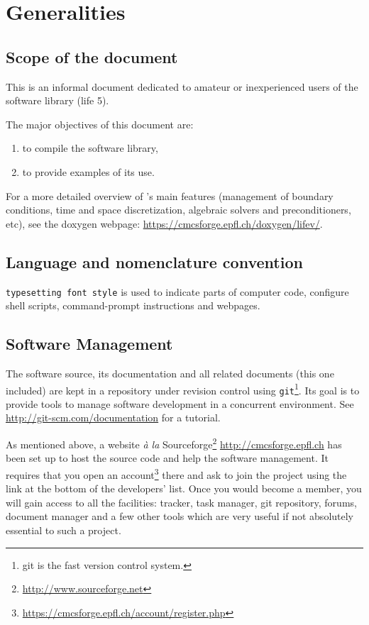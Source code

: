 
\chapter{Generalities}
\label{cha:generalities}

\section{Scope of the document}
\label{sec:scope-document}

This is an informal document dedicated to amateur or inexperienced users of the
software library \thelibrary (life 5).

The major objectives of this document are:
\begin{enumerate}
\item to compile the software library,
\item to provide examples of its use.
\end{enumerate}
For a more detailed overview of \lifev's main features (management of boundary conditions, time and space discretization, algebraic solvers and preconditioners, etc), see the doxygen webpage: \url{https://cmcsforge.epfl.ch/doxygen/lifev/}.
\section{Language and nomenclature convention}
\label{sec:lang-nomencl-conv}

\texttt{typesetting font style} is used to indicate parts of
computer code, configure shell scripts, command-prompt instructions and webpages.

\section{Software Management}
\label{sec:software-management}

The software source, its documentation and all related documents (this
one included) are kept in a repository under revision control
using \verb!git!\footnote{git is the fast version control system.}. Its goal
is to provide tools to manage software development in a concurrent environment.
See \url{http://git-scm.com/documentation}
for a tutorial.

As mentioned above, a website {\it\`a la} Sourceforge\footnote{\url{http://www.sourceforge.net}}
\url{http://cmcsforge.epfl.ch} has been set up
to host the source code and help the software management.
It requires that you open an account\footnote{\url{https://cmcsforge.epfl.ch/account/register.php}}
there and ask to join the project \lifev using the link at the
bottom of the developers' list.
Once you would become a member, you will gain access to all the facilities:
tracker, task manager, git repository, forums, document manager and a few other
tools which are very useful if not absolutely essential to such a project.

